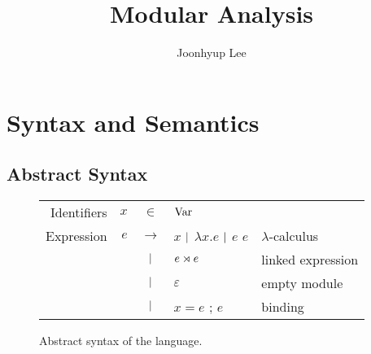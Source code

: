 \documentclass{article}
\title{Modular Analysis}
\author{Joonhyup Lee}
\begin{document}
\maketitle
\section{Syntax and Semantics}
\subsection{Abstract Syntax}
\begin{figure}[htb]
  \centering
  \begin{tabular}{rrcll}
    Identifiers & $x$ & $\in$         & $\text{Var}$                                                     \\
    Expression  & $e$ & $\rightarrow$ & $x$ $|$ $\lambda x.e$ $|$ $e$ $e$ & $\lambda$-calculus \\
                &     & $|$       & ${e}\rtimes{e}$                             & linked expression  \\
                &     & $|$       & $\varepsilon$                             & empty module       \\
                &     & $|$       & $x=e$ ; $e$                               & binding
  \end{tabular}
  \caption{Abstract syntax of the language.}
  \label{fig:syntax}
\end{figure}
\end{document}
